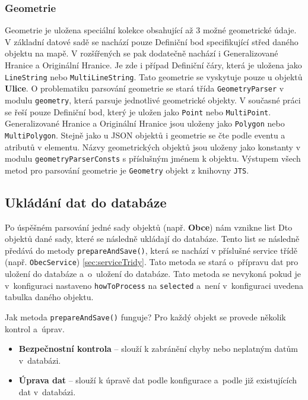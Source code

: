 \subsubsection*{Geometrie}
Geometrie je uložena speciální kolekce obsahující až 3 možné geometrické údaje.
V základní datové sadě se nachází pouze Definiční bod specifikující střed daného objektu na mapě.
V rozšířených se pak dodatečně nachází i Generalizované Hranice a Originální Hranice.
Je zde i případ Definiční čáry, která je uložena jako \texttt{LineString} nebo \texttt{MultiLineString}.
Tato geometrie se vyskytuje pouze u objektů \textbf{Ulice}.
O problematiku parsování geometrie se stará třída \texttt{GeometryParser} v modulu \texttt{geometry}, která parsuje jednotlivé geometrické objekty.
V současné práci se řeší pouze Definiční bod, který je uložen jako \texttt{Point} nebo \texttt{MultiPoint}.
Generalizované Hranice a Originální Hranice jsou uloženy jako \texttt{Polygon} nebo \texttt{MultiPolygon}.
Stejně jako u JSON objektů i geometrie se čte podle eventu a atributů v elementu.
Názvy geometrických objektů jsou uloženy jako konstanty v modulu \texttt{geometryParserConsts} s příslušným jménem k objektu.
Výstupem všech metod pro parsování geometrie je \texttt{Geometry} objekt z knihovny \texttt{JTS}.

\subsection{Ukládání dat do databáze}
Po úspěšném parsování jedné sady objektů (např. \textbf{Obce}) nám vznikne list Dto objektů
dané sady, které se následně ukládají do databáze. Tento list se následně předává do metody \texttt{prepareAndSave()},
která se nachází v příslušné service třídě (např. \texttt{ObecService}) \ref{sec:serviceTridy}.
Tato metoda se stará o~přípravu dat pro uložení do databáze a~o~uložení do databáze.
Tato metoda se nevykoná pokud je v~konfiguraci nastaveno \texttt{howToProcess} na \texttt{selected}
a~není v~konfiguraci uvedena tabulka daného objektu.

Jak metoda \texttt{prepareAndSave()} funguje?
Pro každý objekt se provede několik kontrol a~úprav.

\newpage

\begin{itemize}
    \item \textbf{Bezpečnostní kontrola} -- slouží k zabránění chyby nebo neplatným datům v~databázi.
    \item \textbf{Úprava dat} -- slouží k úpravě dat podle konfigurace a~podle již existujících dat v~databázi.
\end{itemize}

